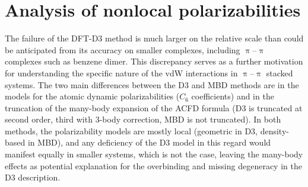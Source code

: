 \section{Analysis of nonlocal polarizabilities}

The failure of the DFT-D3 method is much larger on the relative scale than could be anticipated from its accuracy on smaller complexes, including $\uppi$--$\uppi$ complexes such as benzene dimer.
This discrepancy serves as a further motivation for understanding the specific nature of the vdW interactions in $\uppi$--$\uppi$ stacked systems.
The two main differences between the D3 and MBD methods are in the models for the atomic dynamic polarizabilities ($C_6$ coefficients) and in the truncation of the many-body expansion of the ACFD formula (D3 is truncated at second order, third with 3-body correction, MBD is not truncated).
In both methods, the polarizability models are mostly local (geometric in D3, density-based in MBD), and any deficiency of the D3 model in this regard would manifest equally in smaller systems, which is not the case, leaving the many-body effects as potential explanation for the overbinding and missing degeneracy in the D3 description.

